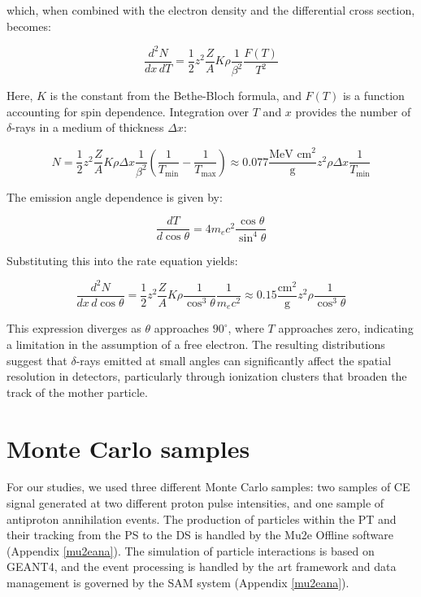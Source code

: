 which, when combined with the electron density and the differential cross section, becomes:

\begin{equation}
\frac{d^2 N}{dx \, dT} = \frac{1}{2} z^2 \frac{Z}{A} K \rho \frac{1}{\beta^2} \frac{F(T)}{T^2}
\end{equation}

Here, $K$ is the constant from the Bethe-Bloch formula, 
and $F(T)$ is a function accounting for spin dependence. 
Integration over $T$ and $x$ provides the number of $\delta$-rays in a medium of thickness $\Delta x$:

\begin{equation}
N = \frac{1}{2} z^2 \frac{Z}{A} K \rho \Delta x \frac{1}{\beta^2} \left(\frac{1}{T_{\text{min}}} - \frac{1}{T_{\text{max}}}\right) \approx 0.077 \frac{\text{MeV cm}^2}{\text{g}} z^2 \rho \Delta x \frac{1}{T_{\text{min}}}
\end{equation}

The emission angle dependence is given by:

\begin{equation}
\frac{dT}{d \cos \theta} = 4 m_e c^2 \frac{\cos \theta}{\sin^4 \theta}
\end{equation}

Substituting this into the rate equation yields:

\begin{equation}
\frac{d^2 N}{dx \, d \cos \theta} = \frac{1}{2} z^2 \frac{Z}{A} K \rho \frac{1}{\cos^3 \theta} \frac{1}{m_e c^2} \approx 0.15 \frac{\text{cm}^2}{\text{g}} z^2 \rho \frac{1}{\cos^3 \theta}
\end{equation}

This expression diverges as $\theta$ approaches $90^\circ$, 
where $T$ approaches zero, indicating a limitation in the 
assumption of a free electron. The resulting distributions 
suggest that $\delta$-rays emitted at small angles can 
significantly affect the spatial resolution in detectors, 
particularly through ionization clusters that broaden the 
track of the mother particle.



\section{Monte Carlo samples}\label{datasample}
For our studies, we used three different  
Monte Carlo samples: two samples of 
CE signal generated at two different 
proton pulse intensities, and one sample of 
antiproton annihilation events. 
The production of particles within 
the PT and their tracking from the PS to the 
DS is handled by the Mu2e Offline software 
(Appendix \ref{mu2eana}). The simulation of 
particle interactions is based on 
GEANT4, and the event processing is handled 
by the art framework and data management is governed by the SAM system (Appendix \ref{mu2eana}).

